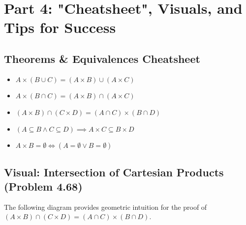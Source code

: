 \documentclass[12pt]{article}
\theoremstyle{definition}
\theoremstyle{remark}
\begin{document}
\section{Part 4: "Cheatsheet", Visuals, and Tips for Success}

\subsection{Theorems \& Equivalences Cheatsheet}
\begin{itemize}
    \item $A \times (B \cup C) = (A \times B) \cup (A \times C)$
    \item $A \times (B \cap C) = (A \times B) \cap (A \times C)$
    \item $(A \times B) \cap (C \times D) = (A \cap C) \times (B \cap D)$
    \item $(A \subseteq B \land C \subseteq D) \implies A \times C \subseteq B \times D$
    \item $A \times B = \emptyset \iff (A = \emptyset \lor B = \emptyset)$
\end{itemize}

\subsection{Visual: Intersection of Cartesian Products (Problem 4.68)}
The following diagram provides geometric intuition for the proof of $(A \times B) \cap (C \times D) = (A \cap C) \times (B \cap D)$.
\end{document}
